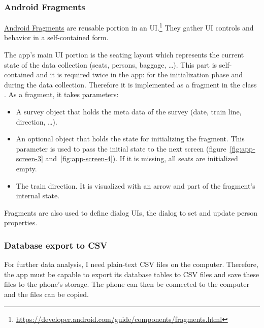 \subsubsection{Android Fragments}

\href{https://developer.android.com/reference/android/app/Fragment.html}{Android
Fragments} are reusable portion in an
\acs{UI}.\footnote{\url{https://developer.android.com/guide/components/fragments.html}}
They gather \acs{UI} controls and behavior in a self-contained form.

The app's main \acs{UI} portion is the seating layout which represents the
current state of the data collection (seats, persons, baggage, \ldots).
This part is self-contained and it is required twice in the app: for the
initialization phase and during the data collection.
Therefore it is implemented as a fragment in the class .
As a fragment, it takes parameters:

\begin{itemize}

  \item A survey object that holds the meta data of the survey (date, train
    line, direction, \ldots).

  \item An optional  object that holds the state for
    initializing the fragment.
    This parameter is used to pass the initial state to the next screen
    (figure~\ref{fig:app-screen-3} and~\ref{fig:app-screen-4}).
    If it is missing, all seats are initialized empty.

  \item The train direction.
    It is visualized with an arrow and part of the fragment's internal state.

\end{itemize}

Fragments are also used to define dialog \acsp{UI}, \eg the dialog to set and
update person properties.

\subsubsection{Database export to \acs{CSV}}

For further data analysis, I need plain-text \acs{CSV} files on the computer.
Therefore, the app must be capable to export its database tables to \acs{CSV}
files and save these files to the phone's storage.
The phone can then be connected to the computer and the files can be copied.

